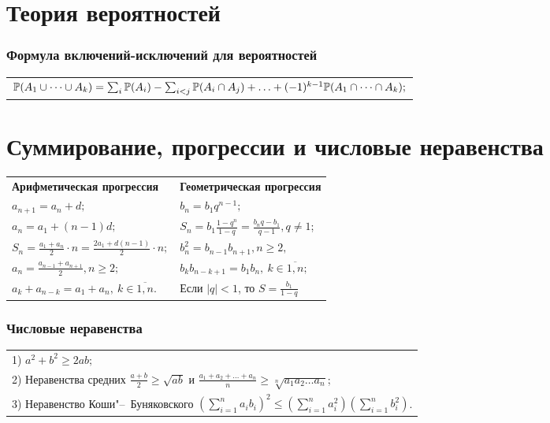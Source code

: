 \section{Теория вероятностей}

\subsubsection{Формула включений-исключений для вероятностей}

\begin{longtable}[l]{l}
	$\mathbb{P}(A_1\cup\dots\cup A_k)= \sum_{i} \mathbb{P}(A_i) - \sum_{i<j} \mathbb{P}(A_i\cap A_j)+\ldots + (-1)^{k-1}\mathbb{P}(A_1\cap\dots\cap A_k);$
\end{longtable}

\section{Суммирование, прогрессии и числовые неравенства}
\begin{longtable}[l]{l l}
{\normalfont\small\sffamily\bfseries Арифметическая прогрессия}
&
{\normalfont\small\sffamily\bfseries Геометрическая прогрессия}
\\
$a_{n+1}=a_n+d;$ & $b_n=b_1 q^{n-1};$
\\
$a_n=a_1+(n-1)d;$ & $S_n=b_1\frac{1-q^n}{1-q}=\frac{b_n q-b_1}{q-1}, q\ne 1$;
\\ 
$S_n=\frac{a_1+a_n}{2}\cdot n=\frac{2a_1+d(n-1)}{2}\cdot n;$ & $b^2_n=b_{n-1}b_{n+1}, n\geq2,$
\\
$a_n=\frac{a_{n-1}+a_{n+1}}{2}, n\geq 2;$ & $b_kb_{n-k+1}=b_1b_n,\ k\in\overline{1,n};$
\\
$a_k+a_{n-k}=a_1+a_n,\ k\in\overline{1,n}.$ & Если $|q|<1$, то $S=\frac{b_1}{1-q}$
\end{longtable}

\subsubsection{Числовые неравенства}

\begin{longtable}[l]{l}
	1) $a^2+b^2 \ge 2ab;$ \\
	2) Неравенства средних $\frac{a+b}{2} \ge \sqrt{ab}$ и $\frac{a_1+a_2+\ldots+a_n}{n} \ge \sqrt[n]{a_1 a_2\ldots a_n}$; \\
	3) Неравенство Коши"--~Буняковского $\left(\sum_{i=1}^n a_i b_i\right)^2 \le \left(\sum_{i=1}^n a_i^2\right) \left(\sum_{i=1}^n b_i^2\right)$.
\end{longtable}


